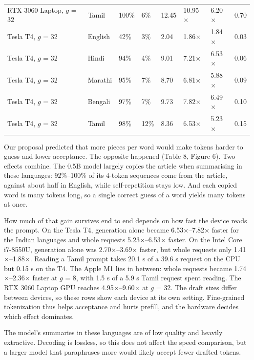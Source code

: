 \documentclass[11pt,a4paper]{article}
\begin{document}
\begin{table}[tbp]
\begin{tabular}{L{2.76cm}L{1.65cm}L{1.38cm}L{1.65cm}L{1.01cm}L{2.11cm}L{1.75cm}L{1.56cm}}
RTX 3060 Laptop, $g$ = 32 & Tamil & 100\% & 6\% & 12.45 & 10.95$\times$ & 6.20$\times$ & 0.70 \\
Tesla T4, $g$ = 32 & English & 42\% & 3\% & 2.04 & 1.86$\times$ & 1.84$\times$ & 0.03 \\
Tesla T4, $g$ = 32 & Hindi & 94\% & 4\% & 9.01 & 7.21$\times$ & 6.53$\times$ & 0.06 \\
Tesla T4, $g$ = 32 & Marathi & 95\% & 7\% & 8.70 & 6.81$\times$ & 5.88$\times$ & 0.09 \\
Tesla T4, $g$ = 32 & Bengali & 97\% & 7\% & 9.73 & 7.82$\times$ & 6.49$\times$ & 0.10 \\
Tesla T4, $g$ = 32 & Tamil & 98\% & 12\% & 8.36 & 6.53$\times$ & 5.23$\times$ & 0.15 \\
\bottomrule
\end{tabular}
\end{table}
Our proposal predicted that more pieces per word would make tokens harder to guess and lower acceptance. The opposite happened (Table 8, Figure 6). Two effects combine. The 0.5B model largely copies the article when summarising in these languages: 92\%--100\% of its 4-token sequences come from the article, against about half in English, while self-repetition stays low. And each copied word is many tokens long, so a single correct guess of a word yields many tokens at once.

How much of that gain survives end to end depends on how fast the device reads the prompt. On the Tesla T4, generation alone became 6.53$\times$--7.82$\times$ faster for the Indian languages and whole requests 5.23$\times$--6.53$\times$ faster. On the Intel Core i7-8550U, generation alone was 2.70$\times$--3.69$\times$ faster, but whole requests only 1.41$\times$--1.88$\times$. Reading a Tamil prompt takes 20.1 s of a 39.6 s request on the CPU but 0.15 s on the T4. The Apple M1 lies in between: whole requests became 1.74$\times$--2.36$\times$ faster at $g$ = 8, with 1.5 s of a 5.9 s Tamil request spent reading. The RTX 3060 Laptop GPU reaches 4.95$\times$--9.60$\times$ at $g$ = 32. The draft sizes differ between devices, so these rows show each device at its own setting. Fine-grained tokenization thus helps acceptance and hurts prefill, and the hardware decides which effect dominates.

The model's summaries in these languages are of low quality and heavily extractive. Decoding is lossless, so this does not affect the speed comparison, but a larger model that paraphrases more would likely accept fewer drafted tokens.
\end{document}
